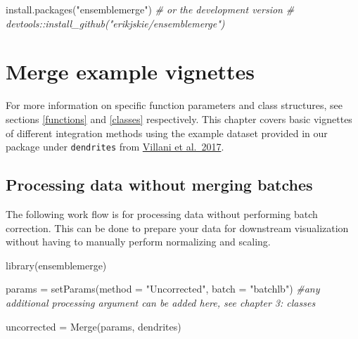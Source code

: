 \documentclass[
]{book}
\newenvironment{Shaded}{\begin{snugshade}}{\end{snugshade}}
\newcommand{\AttributeTok}[1]{\textcolor[rgb]{0.77,0.63,0.00}{#1}}
\newcommand{\CommentTok}[1]{\textcolor[rgb]{0.56,0.35,0.01}{\textit{#1}}}
\newcommand{\FunctionTok}[1]{\textcolor[rgb]{0.00,0.00,0.00}{#1}}
\newcommand{\NormalTok}[1]{#1}
\newcommand{\OtherTok}[1]{\textcolor[rgb]{0.56,0.35,0.01}{#1}}
\newcommand{\StringTok}[1]{\textcolor[rgb]{0.31,0.60,0.02}{#1}}
\begin{document}
\begin{Shaded}
\begin{Highlighting}[]
\FunctionTok{install.packages}\NormalTok{(}\StringTok{"ensemblemerge"}\NormalTok{)}
\CommentTok{\# or the development version}
\CommentTok{\# devtools::install\_github("erikjskie/ensemblemerge")}
\end{Highlighting}
\end{Shaded}

\hypertarget{merge-example-vignettes}{%
\chapter{Merge example vignettes}\label{merge-example-vignettes}}

For more information on specific function parameters and class structures, see sections \ref{functions} and \ref{classes} respectively. This chapter covers basic vignettes of different integration methods using the example dataset provided in our package under \texttt{dendrites} from \href{'https://science.sciencemag.org/content/356/6335/eaah4573.abstract?casa_token=Il6aAbDukAcAAAAA:g6j1TW5RkK2J488DrHHgSmrCRwYTOgFHoH_X6H_bDL7PeuX5h3Ak2zMPEPAi4KKr_WaFZ2ekMc6uwg8'}{Villani et al.~2017}.

\hypertarget{processing-data-without-merging-batches}{%
\section{Processing data without merging batches}\label{processing-data-without-merging-batches}}

The following work flow is for processing data without performing batch correction. This can be done to prepare your data for downstream visualization without having to manually perform normalizing and scaling.

\begin{Shaded}
\begin{Highlighting}[]
\FunctionTok{library}\NormalTok{(ensemblemerge)}

\NormalTok{params }\OtherTok{=} \FunctionTok{setParams}\NormalTok{(}\AttributeTok{method =} \StringTok{"Uncorrected"}\NormalTok{, }\AttributeTok{batch =} \StringTok{"batchlb"}\NormalTok{) }\CommentTok{\#any additional processing argument can be added here, see chapter 3: classes}

\NormalTok{uncorrected }\OtherTok{=} \FunctionTok{Merge}\NormalTok{(params, dendrites)}
\end{Highlighting}
\end{Shaded}
\end{document}
